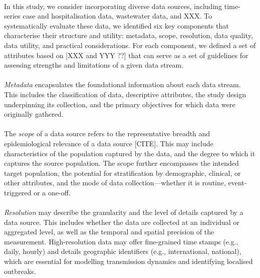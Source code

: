 \documentclass{article}
\begin{document}
\paragraph{}In this study, we consider incorporating diverse data sources, including time-series case and hospitalisation data, wastewater data, and XXX. To systematically evaluate these data, we identified six key components that characterise their structure and utility: metadata, scope,  resolution, data quality, data utility, and practical considerations. For each component, we defined a set of attributes based on [XXX and YYY ??] that can serve as a set of guidelines for assessing strengths and limitations of a given data stream. 

\paragraph{}\textit{Metadata} encapsulates the foundational information about each data stream. This includes the classification of data, descriptive attributes, the study design underpinning its collection, and the primary objectives for which data were originally gathered. 

\paragraph{}The \textit{scope} of a data source refers to the representative breadth and epidemiological relevance of a data source [CITE]. This may include characteristics of the population captured by the data, and the degree to which it captures the source population. The scope further encompasses the intended target population, the potential for stratification by demographic, clinical, or other attributes, and the mode of data collection---whether it is routine, event-triggered or a one-off. 

\paragraph{}\textit{Resolution} may describe the granularity and the level of details captured by a data source. This includes whether the data are collected at an individual or aggregated level, as well as the temporal and spatial precision of the measurement. High-resolution data may offer fine-grained time stamps (e.g., daily, hourly) and details geographic identifiers (e.g., international, national), which are essential for modelling transmission dynamics and identifying localised outbreaks. 
\end{document}
